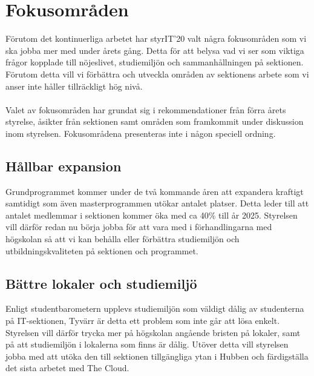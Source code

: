 \documentclass[11pt, noincludeaddress, nopagination]{classes/cthit}
\begin{document}
\section{Fokusområden}
Förutom det kontinuerliga arbetet har styrIT'20 valt några fokusområden som vi ska jobba mer med under årets gång. Detta för att belysa vad vi ser som viktiga frågor kopplade till nöjeslivet, studiemiljön och sammanhållningen på sektionen. Förutom detta vill vi förbättra och utveckla områden av sektionens arbete som vi anser inte håller tillräckligt hög nivå. \\\\
Valet av fokusområden har grundat sig i rekommendationer från förra årets styrelse, åsikter från sektionen samt områden som framkommit under diskussion inom styrelsen. Fokusområdena presenteras inte i någon speciell ordning. 

\subsection{Hållbar expansion}
Grundprogrammet kommer under de två kommande åren att expandera kraftigt samtidigt som även masterprogrammen utökar antalet platser. Detta leder till att antalet medlemmar i sektionen kommer öka med ca 40\% till år 2025. Styrelsen vill därför redan nu börja jobba för att vara med i förhandlingarna med högskolan så att vi kan behålla eller förbättra studiemiljön och utbildningskvaliteten på sektionen och programmet. 

\subsection{Bättre lokaler och studiemiljö}
Enligt studentbarometern upplevs studiemiljön som väldigt dålig av studenterna på IT-sektionen, Tyvärr är detta ett problem som inte går att lösa enkelt. Styrelsen vill därför trycka mer på högskolan angående bristen på lokaler, samt på att studiemiljön i lokalerna som finns är dålig. Utöver detta vill styrelsen jobba med att utöka den till sektionen tillgängliga ytan i Hubben och färdigställa det sista arbetet med The Cloud.
\end{document}
